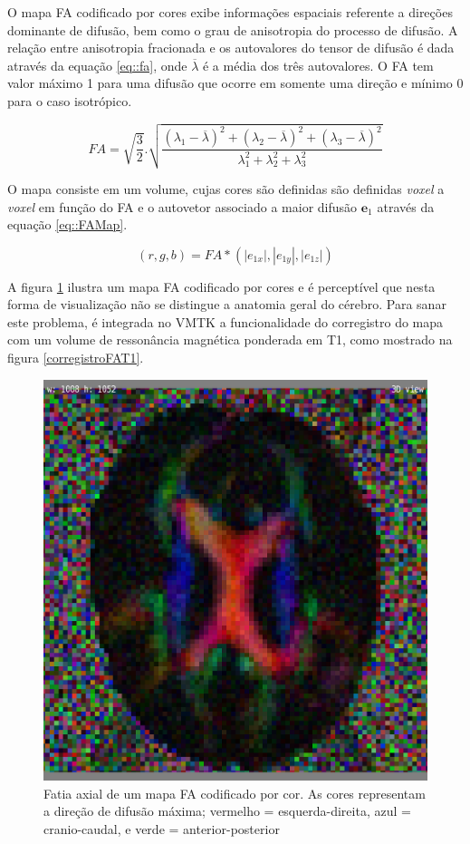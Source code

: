\documentclass[
    12pt,                %
    oneside,            %
    a4paper,            %
    english,            %
    french,                %
    spanish,            %
    brazil                %
    ]{abntex2}
\begin{document}
O mapa FA codificado por cores exibe informações espaciais referente a direções dominante de difusão, bem como o grau de anisotropia do processo de difusão.
A relação entre anisotropia fracionada e os autovalores do tensor de difusão é dada através da equação \ref{eq::fa}, onde $\overline{\lambda}$ é a média dos três autovalores. O FA tem valor máximo 1 para uma difusão que ocorre em somente uma direção e mínimo 0 para o caso isotrópico.

\begin{equation}
\label{eq::fa}
    FA = \sqrt{\frac{3}{2}}.\sqrt{\frac{(\lambda_1 - \overline{\lambda})^2 + (\lambda_2 - \overline{\lambda})^2 + (\lambda_3 - \overline{\lambda})^2}{\lambda_1^2 + \lambda_2^2 + \lambda_3^2}
    }
\end{equation}


O mapa consiste em um volume, cujas cores são definidas são definidas \textit{voxel} a \textit{voxel} em função do FA e o autovetor associado a maior difusão $\mathbf{e}_1$ através da equação \ref{eq::FAMap}.

\begin{equation}
\label{eq::FAMap}
    (r,g,b) = FA*(|e_{1x}|,|e_{1y}|,|e_{1z}|)
\end{equation}

A figura \ref{fig::MapaFA} ilustra um mapa FA codificado por cores e é perceptível que nesta forma de visualização não se distingue a anatomia geral do cérebro. Para sanar este problema, é integrada no VMTK a funcionalidade do corregistro do mapa com um volume de ressonância magnética ponderada em T1, como mostrado na figura \ref{corregistroFAT1}.

\begin{figure}[H]

    \centering

    \includegraphics[width=0.45\linewidth, angle=0]{figs/Exemplo_Trabalhos_Relacionados/MapaFA.png}
    \caption{Fatia axial de um mapa FA codificado por cor. As cores representam a direção de difusão máxima; vermelho = esquerda-direita, azul = cranio-caudal, e verde = anterior-posterior}
    \label{fig::MapaFA}
\end{figure}
\end{document}
